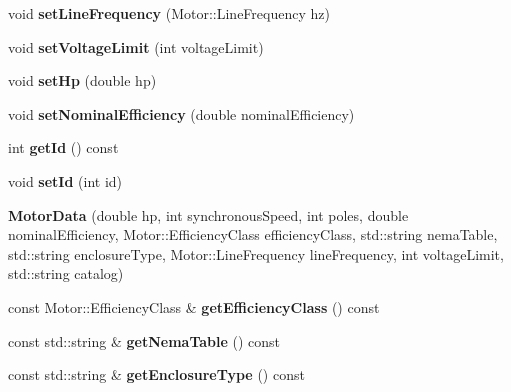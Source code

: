 \begin{DoxyCompactItemize}
\item 
\mbox{\label{class_motor_data_ae7e4126c99e06bf519040f6641a49b85}} 
void {\bfseries set\+Line\+Frequency} (Motor\+::\+Line\+Frequency hz)
\item 
\mbox{\label{class_motor_data_a7be5a2f208a11a3955d4cb2e0b122901}} 
void {\bfseries set\+Voltage\+Limit} (int voltage\+Limit)
\item 
\mbox{\label{class_motor_data_a2d8f0cc129df3330598922a61e399639}} 
void {\bfseries set\+Hp} (double hp)
\item 
\mbox{\label{class_motor_data_a78d378a3795ba0b7bd9e11ef4188e7f5}} 
void {\bfseries set\+Nominal\+Efficiency} (double nominal\+Efficiency)
\item 
\mbox{\label{class_motor_data_ac67a3f78e851968c9979e60cbf0f495b}} 
int {\bfseries get\+Id} () const
\item 
\mbox{\label{class_motor_data_ae26351f2cfd4e0acbd413b008ac2759f}} 
void {\bfseries set\+Id} (int id)
\item 
\mbox{\label{class_motor_data_a1308670141643b63365eef37069f03b6}} 
{\bfseries Motor\+Data} (double hp, int synchronous\+Speed, int poles, double nominal\+Efficiency, Motor\+::\+Efficiency\+Class efficiency\+Class, std\+::string nema\+Table, std\+::string enclosure\+Type, Motor\+::\+Line\+Frequency line\+Frequency, int voltage\+Limit, std\+::string catalog)
\item 
\mbox{\label{class_motor_data_a7a85bda1580ee26f473f02829becf068}} 
const Motor\+::\+Efficiency\+Class \& {\bfseries get\+Efficiency\+Class} () const
\item 
\mbox{\label{class_motor_data_af77f6e85fd6ee9a9d5bb2711381e5141}} 
const std\+::string \& {\bfseries get\+Nema\+Table} () const
\item 
\mbox{\label{class_motor_data_a4272913727c7a643a199f95dd6c0ce25}} 
const std\+::string \& {\bfseries get\+Enclosure\+Type} () const
\item 

\end{DoxyCompactItemize}
